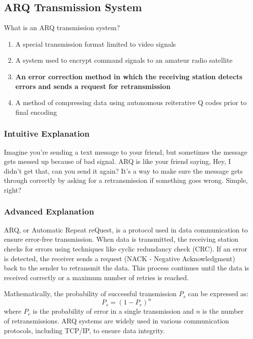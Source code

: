\subsection{ARQ Transmission System}
\label{T8D11}

\begin{tcolorbox}[colback=gray!10!white,colframe=black!75!black,title=T8D11]
What is an ARQ transmission system?
\begin{enumerate}[label=\Alph*)]
    \item A special transmission format limited to video signals
    \item A system used to encrypt command signals to an amateur radio satellite
    \item \textbf{An error correction method in which the receiving station detects errors and sends a request for retransmission}
    \item A method of compressing data using autonomous reiterative Q codes prior to final encoding
\end{enumerate}
\end{tcolorbox}

\subsubsection{Intuitive Explanation}
Imagine you're sending a text message to your friend, but sometimes the message gets messed up because of bad signal. ARQ is like your friend saying, Hey, I didn't get that, can you send it again? It’s a way to make sure the message gets through correctly by asking for a retransmission if something goes wrong. Simple, right?

\subsubsection{Advanced Explanation}
ARQ, or Automatic Repeat reQuest, is a protocol used in data communication to ensure error-free transmission. When data is transmitted, the receiving station checks for errors using techniques like cyclic redundancy check (CRC). If an error is detected, the receiver sends a request (NACK - Negative Acknowledgment) back to the sender to retransmit the data. This process continues until the data is received correctly or a maximum number of retries is reached.

Mathematically, the probability of successful transmission \( P_s \) can be expressed as:
\[ P_s = (1 - P_e)^n \]
where \( P_e \) is the probability of error in a single transmission and \( n \) is the number of retransmissions. ARQ systems are widely used in various communication protocols, including TCP/IP, to ensure data integrity.

